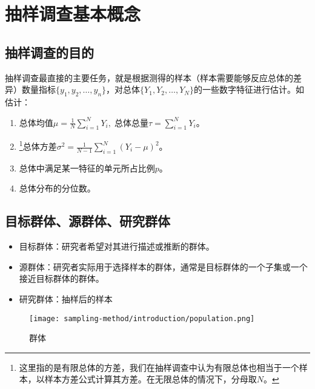 \chapter{抽样调查基本概念}

\section{抽样调查的目的}
抽样调查最直接的主要任务，就是根据测得的样本（样本需要能够反应总体的差异）数量指标$\{y_1,y_2,\dots,y_n\}$，对总体$\{Y_1,Y_2,\dots,Y_N\}$的一些数字特征进行估计。如估计：
\begin{enumerate}
	\item $\text{总体均值}\mu=\frac{1}{N}\sum_{i=1}^NY_i,\;\text{总体总量}\tau=\sum_{i=1}^NY_i$。
	\item \footnote{这里指的是有限总体的方差，我们在抽样调查中认为有限总体也相当于一个样本，以样本方差公式计算其方差。在无限总体的情况下，分母取$N$。}$\text{总体方差}\sigma^2=\frac{1}{N-1}\sum_{i=1}^N(Y_i-\mu)^2$。
	\item 总体中满足某一特征的单元所占比例$p$。
	\item 总体分布的分位数。
\end{enumerate}

\section{目标群体、源群体、研究群体}
\begin{itemize}
	\item 目标群体：研究者希望对其进行描述或推断的群体。
	\item 源群体：研究者实际用于选择样本的群体，通常是目标群体的一个子集或一个接近目标群体的群体。
	\item 研究群体：抽样后的样本
\end{itemize}
\begin{figure}[htbp] 
	\centering 
	\texttt{[image: sampling-method/introduction/population.png]}
	\caption{群体} 
\end{figure}

